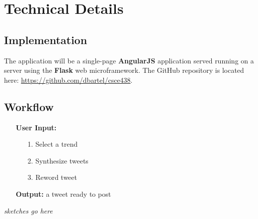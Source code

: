\documentclass{article}
\begin{document}
\section*{Technical Details}

\subsection*{Implementation}
The application will be a single-page \textbf{AngularJS} application served running on a server using the \textbf{Flask} web microframework.
The GitHub repository is located here: \url{https://github.com/dbartel/csce438}.

\subsection*{Workflow}
\begin{enumerate}
	\item[\textbullet] \textbf{User Input:}
          \begin{enumerate}
            \item[1.] Select a trend
            \item[2.] Synthesize tweets
            \item[3.] Reword tweet
          \end{enumerate}
	\item[\textbullet] \textbf{Output:} a tweet ready to post
\end{enumerate}
\textit{sketches go here}
\end{document}
